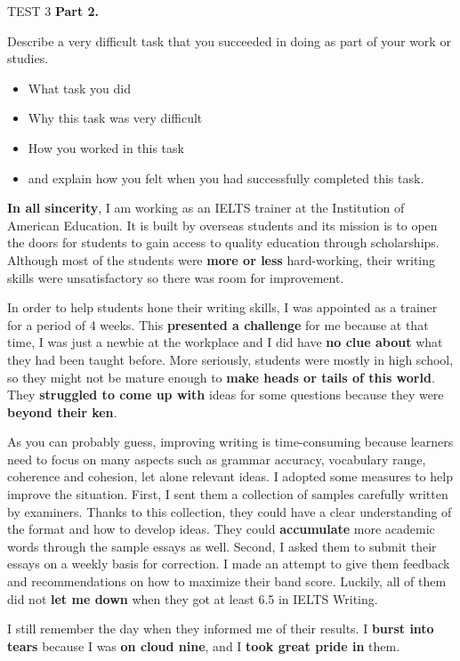 \begin{glossarymc}[Cambridge 14]
\begin{test}{TEST 3}
    \noindent
    \textbf{Part 2.}
    \begin{qa}{Describe a very difficult task that you succeeded in doing as part of your work or studies.}
    \begin{itemize}
        \item What task you did  
        \item Why this task was very difficult  
        \item How you worked in this task  
        \item and explain how you felt when you had successfully completed this task.  
    \end{itemize}

    \textbf{In all sincerity}, I am working as an IELTS trainer at the Institution of American Education. It is built by overseas students and its mission is to open the doors for students to gain access to quality education through scholarships. Although most of the students were \textbf{more or less} hard-working, their writing skills were unsatisfactory so there was room for improvement.  

    In order to help students hone their writing skills, I was appointed as a trainer for a period of 4 weeks. This \textbf{presented a challenge} for me because at that time, I was just a newbie at the workplace and I did have \textbf{no clue about} what they had been taught before. More seriously, students were mostly in high school, so they might not be mature enough to \textbf{make heads or tails of this world}. They \textbf{struggled to come up with} ideas for some questions because they were \textbf{beyond their ken}.  

    As you can probably guess, improving writing is time-consuming because learners need to focus on many aspects such as grammar accuracy, vocabulary range, coherence and cohesion, let alone relevant ideas. I adopted some measures to help improve the situation. First, I sent them a collection of samples carefully written by examiners. Thanks to this collection, they could have a clear understanding of the format and how to develop ideas. They could \textbf{accumulate} more academic words through the sample essays as well. Second, I asked them to submit their essays on a weekly basis for correction. I made an attempt to give them feedback and recommendations on how to maximize their band score. Luckily, all of them did not \textbf{let me down} when they got at least 6.5 in IELTS Writing.  

    I still remember the day when they informed me of their results. I \textbf{burst into tears} because I was \textbf{on cloud nine}, and I \textbf{took great pride in} them.
    \end{qa}


\end{test}
\end{glossarymc}
